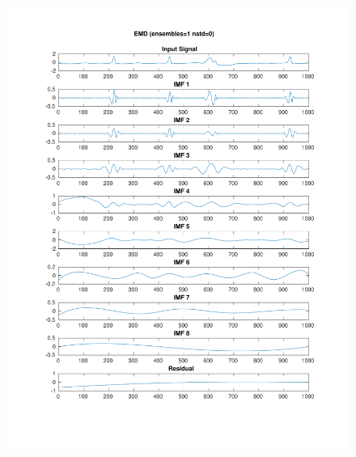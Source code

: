 \documentclass[11pt,a4paper]{article}
\begin{document}
\begin{figure}[H]
\centering
\begin{minipage}{0.48\textwidth}
	\centering
	\includegraphics[width=\textwidth]{fig/221l1_emd.pdf}
\end{minipage}
\begin{minipage}{0.48\textwidth}
	\centering

\end{minipage}
\end{figure}
\end{document}
